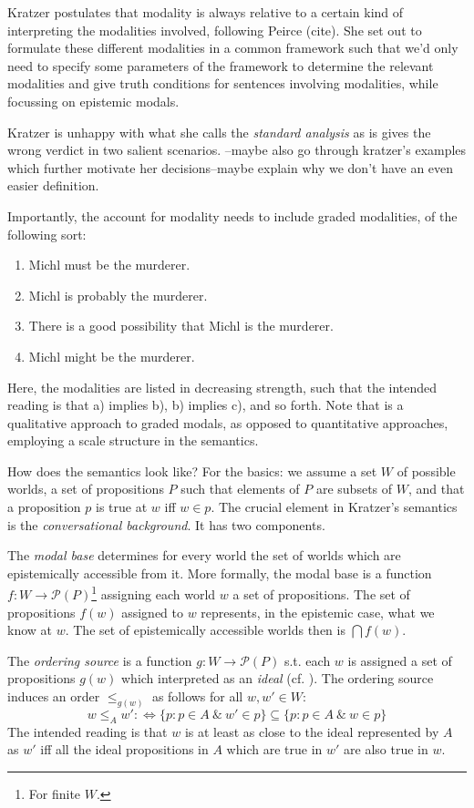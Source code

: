 \documentclass{article}
\begin{document}
Kratzer postulates that modality is always relative to a certain kind of interpreting the modalities involved, following Peirce (cite).
She set out to formulate these different modalities in a common framework such that we'd only need to specify some parameters of the framework to determine the relevant modalities and give truth conditions for sentences involving modalities, while focussing on epistemic modals.

Kratzer is unhappy with what she calls the \emph{standard analysis} as is gives the wrong verdict in two salient scenarios.
--maybe also go through kratzer's examples which further motivate her decisions--maybe explain why we don't have an even easier definition.

Importantly, the account for modality needs to include graded modalities, of the following sort:
\begin{enumerate}[nosep,label=\alph*)]
  \item Michl must be the murderer.
  \item Michl is probably the murderer.
  \item There is a good possibility that Michl is the murderer.
  \item Michl might be the murderer.
\end{enumerate}
Here, the modalities are listed in decreasing strength, such that the intended reading is that a) implies b), b) implies c), and so forth. Note that is a qualitative approach to graded modals, as opposed to quantitative approaches, employing a scale structure in the semantics. 

How does the semantics look like? For the basics: we assume a set $W$ of possible worlds, a set of propositions $P$ such that elements of $P$ are subsets of $W$, and that a proposition $p$ is true at $w$ iff $w \in p$. The crucial element in Kratzer's semantics is the \emph{conversational background}. It has two components.

The \emph{modal base} determines for every world the set of worlds which are epistemically accessible from it.
More formally, the modal base is a function $f: W \rightarrow \mathcal{P}(P)$\footnote{For finite $W$.} assigning each world $w$ a set of propositions.
The set of propositions $f(w)$ assigned to $w$ represents, in the epistemic case, what we know at $w$.
The set of epistemically accessible worlds then is $\bigcap f(w)$.

The \emph{ordering source} is a function $g: W \rightarrow \mathcal{P}(P)$ s.t. each $w$ is assigned a set of propositions $g(w)$ which interpreted as an \emph{ideal} (cf. \cite{lewis81_order_seman_premis_seman_count}). The ordering source induces an order $\leq_{g(w)}$ as follows for all $w,w' \in W$: 
\[
w \leq_A w' :\iff \{p: p\in A ~\&~ w' \in p\} \subseteq \{p: p\in A ~\&~ w \in p\}
\]
The intended reading is that $w$ is at least as close to the ideal represented by $A$ as $w'$ iff all the ideal propositions in $A$ which are true in $w'$ are also true in $w$. 
\end{document}
